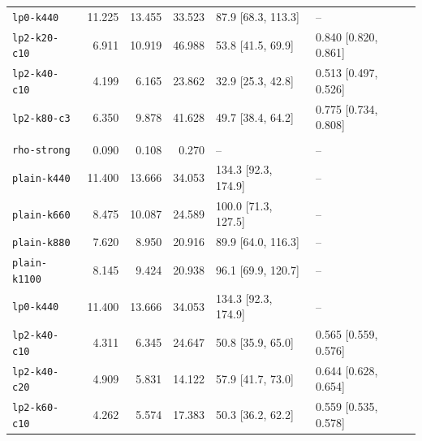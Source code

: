 \begin{tabular}{@{}lrrrll@{}}
\texttt{lp0-k440} & 11.225 & 13.455 & 33.523 & 87.9 [68.3, 113.3] & -- \\
\texttt{lp2-k20-c10} & 6.911 & 10.919 & 46.988 & 53.8 [41.5, 69.9] & 0.840 [0.820, 0.861] \\
\texttt{lp2-k40-c10} & 4.199 & 6.165 & 23.862 & 32.9 [25.3, 42.8] & 0.513 [0.497, 0.526] \\
\texttt{lp2-k80-c3} & 6.350 & 9.878 & 41.628 & 49.7 [38.4, 64.2] & 0.775 [0.734, 0.808] \\
\addlinespace
\multicolumn{6}{@{}l}{$n=61$, session 2, 3 workloads (best plain: \texttt{plain-k880})} \\
\addlinespace[2pt]
\texttt{rho-strong} & 0.090 & 0.108 & 0.270 & -- & -- \\
\texttt{plain-k440} & 11.400 & 13.666 & 34.053 & 134.3 [92.3, 174.9] & -- \\
\texttt{plain-k660} & 8.475 & 10.087 & 24.589 & 100.0 [71.3, 127.5] & -- \\
\texttt{plain-k880} & 7.620 & 8.950 & 20.916 & 89.9 [64.0, 116.3] & -- \\
\texttt{plain-k1100} & 8.145 & 9.424 & 20.938 & 96.1 [69.9, 120.7] & -- \\
\texttt{lp0-k440} & 11.400 & 13.666 & 34.053 & 134.3 [92.3, 174.9] & -- \\
\texttt{lp2-k40-c10} & 4.311 & 6.345 & 24.647 & 50.8 [35.9, 65.0] & 0.565 [0.559, 0.576] \\
\texttt{lp2-k40-c20} & 4.909 & 5.831 & 14.122 & 57.9 [41.7, 73.0] & 0.644 [0.628, 0.654] \\
\texttt{lp2-k60-c10} & 4.262 & 5.574 & 17.383 & 50.3 [36.2, 62.2] & 0.559 [0.535, 0.578] \\
\bottomrule
\end{tabular}
